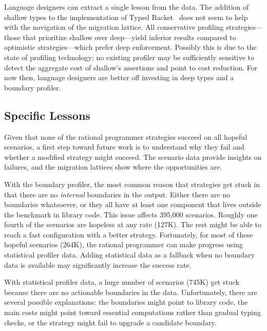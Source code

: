Language designers can extract a single lesson from the data.  The addition of
shallow types to the implementation of Typed Racket~\cite{g-deep-shallow} does
not seem to help with the navigation of the migration lattice. All conservative
profiling strategies---those that prioritize shallow over deep---yield inferior
results compared to optimistic strategies---which prefer deep
enforcement. Possibly this is due to the state of profiling technology; no
existing profiler may be sufficiently sensitive to detect the aggregate cost of
shallow's assertions and point to cost reduction.  For now then, language
designers are better off investing in deep types and a boundary profiler.




\subsection{Specific Lessons}
\label{s:specific-lessons}

Given that none of the rational programmer strategies
succeed on all hopeful scenarios, a first step toward
future work is to understand why they fail and whether
a modified strategy might succeed.
The scenario data provide insights on failures,
and the migration lattices show where the opportunities are.

With the boundary profiler, the most common reason that strategies get stuck in
that there are no \emph{internal} boundaries in the output.  Either there are no
boundaries whatsoever, or they all have at least one component that lives
outside the benchmark in library code.  This issue affects 395,000 scenarios.
Roughly one fourth of the scenarios are hopeless at any rate (127K).  The rest
might be able to reach a fast configuration with a better strategy.
Fortunately, for most of these hopeful scenarios (264K), the rational programmer
can make progress using statistical profiler data.  Adding statistical data as a
fallback when no boundary data is available may significantly increase the
success rate.

With statistical profiler data, a huge number of scenarios (745K) get stuck
because there are no actionable boundaries in the data.
Unfortunately, there are several possible explanations:
the boundaries might point to library code, the main costs might point toward
essential computations rather than gradual typing checks, or the strategy
might fail to upgrade a candidate boundary.

